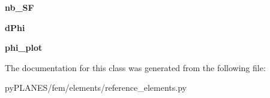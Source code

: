 \begin{DoxyCompactItemize}
{\bfseries nb\+\_\+\+SF}
\item 
\mbox{\label{classpy_p_l_a_n_e_s_1_1fem_1_1elements_1_1reference__elements_1_1_kt_a1f64cead6e00d91f590c9ce2b4b27104}} 
{\bfseries d\+Phi}
\item 
\mbox{\label{classpy_p_l_a_n_e_s_1_1fem_1_1elements_1_1reference__elements_1_1_kt_abb547d828cef870c93dda85a6191c29d}} 
{\bfseries phi\+\_\+plot}
\end{DoxyCompactItemize}


The documentation for this class was generated from the following file\+:\begin{DoxyCompactItemize}
\item 
py\+P\+L\+A\+N\+E\+S/fem/elements/reference\+\_\+elements.\+py\end{DoxyCompactItemize}
